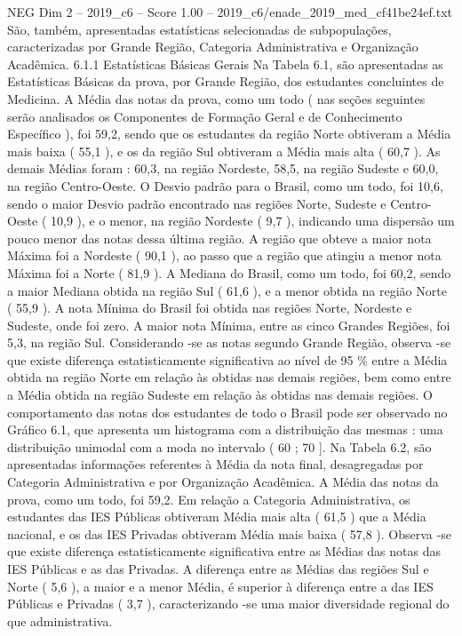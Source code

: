 \begin{textsample}{NEG Dim 2 – 2019\_c6 – Score 1.00 – 2019\_c6/enade\_2019\_med\_cf41be24ef.txt}
São, também, apresentadas estatísticas selecionadas de subpopulações, caracterizadas por Grande Região, Categoria Administrativa e Organização Acadêmica. 6.1.1 Estatísticas Básicas Gerais Na Tabela 6.1, são apresentadas as Estatísticas Básicas da prova, por Grande Região, dos estudantes concluintes de Medicina.
A Média das notas da prova, como um todo ( nas seções seguintes serão analisados os Componentes de Formação Geral e de Conhecimento Específico ), foi 59,2, sendo que os estudantes da região Norte obtiveram a Média mais baixa ( 55,1 ), e os da região Sul obtiveram a Média mais alta ( 60,7 ).
As demais Médias foram : 60,3, na região Nordeste, 58,5, na região Sudeste e 60,0, na região Centro-Oeste.
O Desvio padrão para o Brasil, como um todo, foi 10,6, sendo o maior Desvio padrão encontrado nas regiões Norte, Sudeste e Centro-Oeste ( 10,9 ), e o menor, na região Nordeste ( 9,7 ), indicando uma dispersão um pouco menor das notas dessa última região.
A região que obteve a maior nota Máxima foi a Nordeste ( 90,1 ), ao passo que a região que atingiu a menor nota Máxima foi a Norte ( 81,9 ).
A Mediana do Brasil, como um todo, foi 60,2, sendo a maior Mediana obtida na região Sul ( 61,6 ), e a menor obtida na região Norte ( 55,9 ).
A nota Mínima do Brasil foi obtida nas regiões Norte, Nordeste e Sudeste, onde foi zero.
A maior nota Mínima, entre as cinco Grandes Regiões, foi 5,3, na região Sul.
Considerando -se as notas segundo Grande Região, observa -se que existe diferença estatisticamente significativa ao nível de 95 \% entre a Média obtida na região Norte em relação às obtidas nas demais regiões, bem como entre a Média obtida na região Sudeste em relação às obtidas nas demais regiões.
O comportamento das notas dos estudantes de todo o Brasil pode ser observado no Gráfico 6.1, que apresenta um histograma com a distribuição das mesmas : uma distribuição unimodal com a moda no intervalo ( 60 ; 70 ].
Na Tabela 6.2, são apresentadas informações referentes à Média da nota final, desagregadas por Categoria Administrativa e por Organização Acadêmica.
A Média das notas da prova, como um todo, foi 59,2.
Em relação a Categoria Administrativa, os estudantes das IES Públicas obtiveram Média mais alta ( 61,5 ) que a Média nacional, e os das IES Privadas obtiveram Média mais baixa ( 57,8 ).
Observa -se que existe diferença estatisticamente significativa entre as Médias das notas das IES Públicas e as das Privadas.
A diferença entre as Médias das regiões Sul e Norte ( 5,6 ), a maior e a menor Média, é superior à diferença entre a das IES Públicas e Privadas ( 3,7 ), caracterizando -se uma maior diversidade regional do que administrativa.

\end{textsample}
